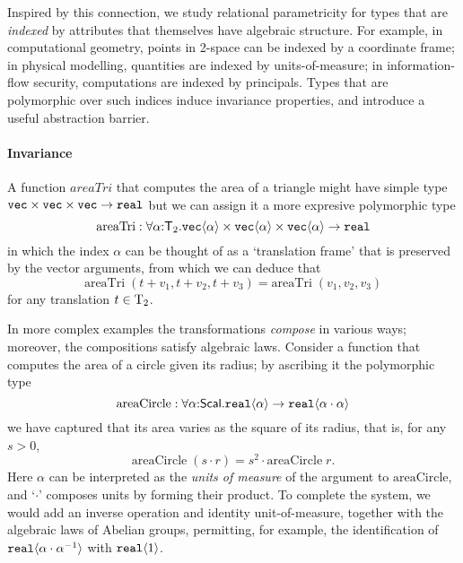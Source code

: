 Inspired by this connection, we study relational parametricity for
types that are \emph{indexed} by attributes that themselves have
algebraic structure.  For example, in computational geometry, points
in 2-space can be indexed by a coordinate frame; in physical
modelling, quantities are indexed by units-of-measure; in
information-flow security, computations are indexed by principals.
Types that are polymorphic over such indices induce invariance
properties, and introduce a useful abstraction barrier.

\paragraph{Invariance}
A function $\mathit{areaTri}$ that computes the area of a triangle might
have simple type $\textup{\texttt{vec}}\times\textup{\texttt{vec}}\times\textup{\texttt{vec}}\to\texttt{real}$
but we can assign it a more expresive polymorphic type
\[
\mathrm{areaTri} : \forall\alpha\mathord:\mathsf{T}_2.
  \textup{\texttt{vec}}\langle \alpha \rangle \times \textup{\texttt{vec}}\langle \alpha \rangle \times \textup{\texttt{vec}}\langle \alpha \rangle \to \texttt{real} \\
\]
in which the index $\alpha$ can be thought of as a `translation frame' that is
preserved by the vector arguments, from which we can deduce that
\[
\mathrm{areaTri}\;(t + v_1, t + v_2, t + v_3) = 
\mathrm{areaTri}\;(v_1, v_2, v_3)
\]
for any translation $t\in\mathrm{T}_2$.

In more complex examples the transformations \emph{compose} in various
ways; moreover, the compositions satisfy algebraic laws. Consider a function
that computes the area of a circle given its radius; by ascribing it
the polymorphic type
\[
\mathrm{areaCircle} : \forall\alpha\mathord:\mathsf{Scal}.\textup{\texttt{real}}\langle \alpha \rangle\to
\textup{\texttt{real}}\langle \alpha\cdot\alpha \rangle
\]
we have captured that its area varies as the square of its radius, that is, for any $s>0$,
\[
\mathrm{areaCircle}\;(s\cdot r) = s^2\cdot \mathrm{areaCircle}\;r.
\]
Here $\alpha$ can be interpreted as the \emph{units of measure} of the argument
to $\mathrm{areaCircle}$, and `$\cdot$' composes units by forming
their product. To complete the system, we would add an inverse
operation and identity unit-of-measure, together with the algebraic laws of
Abelian groups, permitting, for example, the identification of
$\textup{\texttt{real}}\langle \alpha\cdot\alpha^{-1} \rangle$ with $\textup{\texttt{real}}\langle 1 \rangle$.

